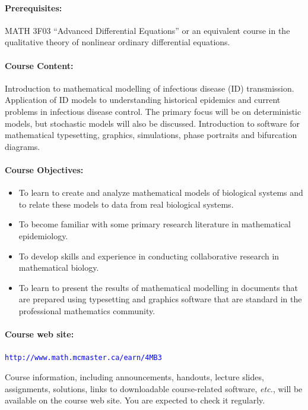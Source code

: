 \documentclass[12pt]{article}
\newcommand{\url}[1]{{\tt\textcolor{blue}{#1}}}
\begin{document}
\paragraph*{Prerequisites:} MATH 3F03 ``Advanced Differential Equations'' or an equivalent course in the qualitative theory of nonlinear ordinary differential equations.

\paragraph*{Course Content:}
Introduction to mathematical modelling of infectious disease (ID) transmission.  Application of ID models to understanding historical epidemics and current problems in infectious disease control.  The primary focus will be on deterministic models, but stochastic models will also be discussed.   Introduction to software for mathematical typesetting, graphics, simulations, phase portraits and bifurcation diagrams.

\paragraph*{Course Objectives:}

\begin{itemize}
\item To learn to create and analyze mathematical models of biological systems and to relate these models to data from real biological systems.  
\item To become familiar with some primary research literature in mathematical epidemiology.
\item To develop skills and experience in conducting collaborative research in mathematical biology.
\item To learn to present the results of mathematical modelling in documents that are prepared using typesetting and graphics software that are standard in the professional mathematics community.
\end{itemize}

\paragraph*{Course web site:} \url{http://www.math.mcmaster.ca/earn/4MB3}

\noindent
Course information, including announcements, handouts, lecture slides, assignments, solutions, links to downloadable course-related software, {\it etc.\/}, will be available on the course web site.  You are expected to check it regularly.
\end{document}
